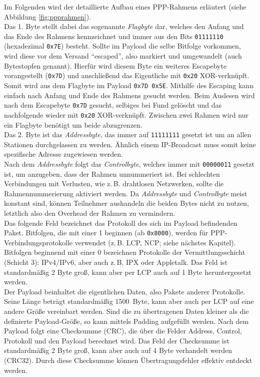\documentclass[journal,11pt]{IEEEtran}
\begin{document}
Im Folgenden wird der detaillierte Aufbau eines PPP-Rahmens erläutert (siehe Abbildung \ref{fig:ppprahmen}).\\
Das 1. Byte stellt dabei das sogenannte \textit{Flagbyte} dar, welches den Anfang und das Ende des Rahmens kennzeichnet und immer aus den Bits \texttt{01111110} (hexadezimal \texttt{0x7E}) besteht. Sollte im Payload die selbe Bitfolge vorkommen, wird diese vor dem Versand ``escaped'', also markiert und umgewandelt (auch Bytestopfen genannt). Hierfür wird diesem Byte ein weiteres Escapebyte vorangestellt (\texttt{0x7D}) und anschließend das Eigentliche mit \texttt{0x20} XOR-verknüpft. Somit wird aus dem Flagbyte im Payload \texttt{0x7D 0x5E}. Mithilfe des Escaping kann einfach nach Anfang und Ende des Rahmens gesucht werden. Beim Auslesen wird nach dem Escapebyte \texttt{0x7D} gesucht, selbiges bei Fund gelöscht und das nachfolgende wieder mit \texttt{0x20} XOR-verknüpft. Zwischen zwei Rahmen wird nur ein Flagbyte benötigt um beide abzugrenzen.\\
Das 2. Byte ist das \textit{Addressbyte}, das immer auf \texttt{11111111} gesetzt ist um an allen Stationen durchgelassen zu werden. Ähnlich einem IP-Broadcast muss somit keine spezifische Adresse zugewiesen werden.\\
Nach dem \textit{Addressbyte} folgt das \textit{Controlbyte}, welches immer mit \texttt{00000011} gesetzt ist, um anzugeben, dass der Rahmen unnummeriert ist. Bei schlechten Verbindungen mit Verlusten, wie z.\,B. drahtlosen Netzwerken, sollte die Rahmennummerierung aktiviert werden. Da \textit{Addressbyte} und \textit{Controlbyte} meist konstant sind, können Teilnehmer aushandeln die beiden Bytes nicht zu nutzen, letztlich also den Overhead der Rahmen zu vermindern.\\
Das folgende Feld bezeichnet das Protokoll des sich im Payload befindenden Paket. Bitfolgen, die mit einer 1 beginnen (ab \texttt{0x8000}), werden für PPP-Verbindungsprotokolle verwendet (z.\,B. LCP, NCP; siehe nächstes Kapitel). Bitfolgen beginnend mit einer 0 bezeichnen Protokolle der Vermittlungsschicht (Schicht 3): IPv4/IPv6, aber auch z.\,B. IPX oder Appletalk. Das Feld ist standardmäßig 2 Byte groß, kann aber per LCP auch auf 1 Byte heruntergesetzt werden.\\
Der Payload beinhaltet die eigentlichen Daten, also Pakete anderer Protokolle. Seine Länge beträgt standardmäßig 1500~Byte, kann aber auch per LCP auf eine andere Größe vereinbart werden. Sind die zu übertragenen Daten kleiner als die definierte Payload-Größe, so kann mittels Padding aufgefüllt werden.
Nach dem Payload folgt eine Checksumme (CRC), die über die Felder Address, Control, Protokoll und den Payload berechnet wird. Das Feld der Checksumme ist standardmäßig 2 Byte groß, kann aber auch auf 4 Byte verhandelt werden (CRC32). Durch diese Checksumme können Übertragungsfehler effektiv entdeckt werden.
\end{document}
